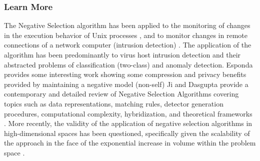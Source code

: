 % 
% 
\subsubsection{Learn More}
The Negative Selection algorithm has been applied to the monitoring of changes in the execution behavior of Unix processes \cite{Forrest1996, Hofmeyr1998}, and to monitor changes in remote connections of a network computer (intrusion detection) \cite{Hofmeyr1999, Hofmeyr1999a}. The application of the algorithm has been predominantly to virus host intrusion detection and their abstracted problems of classification (two-class) and anomaly detection.
Esponda provides some interesting work showing some compression and privacy benefits provided by maintaining a negative model (non-self) \cite{Darlington2005}
Ji and Dasgupta provide a contemporary and detailed review of Negative Selection Algorithms covering topics such as data representations, matching rules, detector generation procedures, computational complexity, hybridization, and theoretical frameworks \cite{Ji2007}.
More recently, the validity of the application of negative selection algorithms in high-dimensional spaces has been questioned, specifically given the scalability of the approach in the face of the exponential increase in volume within the problem space \cite{Stibor2006}.

